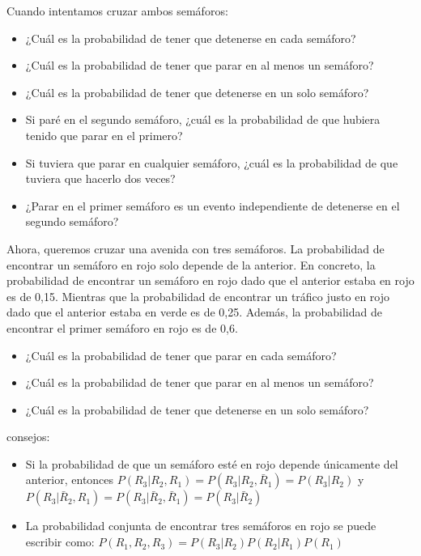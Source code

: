 \documentclass[
]{book}
\providecommand{\tightlist}{%
  \setlength{\itemsep}{0pt}\setlength{\parskip}{0pt}}
\begin{document}
Cuando intentamos cruzar ambos semáforos:

\begin{itemize}
\tightlist
\item
  ¿Cuál es la probabilidad de tener que detenerse en cada semáforo?
\item
  ¿Cuál es la probabilidad de tener que parar en al menos un semáforo?
\item
  ¿Cuál es la probabilidad de tener que detenerse en un solo semáforo?
\item
  Si paré en el segundo semáforo, ¿cuál es la probabilidad de que hubiera tenido que parar en el primero?
\item
  Si tuviera que parar en cualquier semáforo, ¿cuál es la probabilidad de que tuviera que hacerlo dos veces?
\item
  ¿Parar en el primer semáforo es un evento independiente de detenerse en el segundo semáforo?
\end{itemize}

Ahora, queremos cruzar una avenida con tres semáforos. La probabilidad de encontrar un semáforo en rojo solo depende de la anterior. En concreto, la probabilidad de encontrar un semáforo en rojo dado que el anterior estaba en rojo es de 0,15. Mientras que la probabilidad de encontrar un tráfico justo en rojo dado que el anterior estaba en verde es de 0,25. Además, la probabilidad de encontrar el primer semáforo en rojo es de 0,6.

\begin{itemize}
\tightlist
\item
  ¿Cuál es la probabilidad de tener que parar en cada semáforo?
\item
  ¿Cuál es la probabilidad de tener que parar en al menos un semáforo?
\item
  ¿Cuál es la probabilidad de tener que detenerse en un solo semáforo?
\end{itemize}

consejos:

\begin{itemize}
\item
  Si la probabilidad de que un semáforo esté en rojo depende únicamente del anterior, entonces
  \(P(R_3|R_2,R_1)=P(R_3|R_2,\bar{R}_1)=P(R_3|R_2)\) y \(P(R_3|\bar{R}_2,R_1)=P(R_3 |\bar{R}_2,\bar{R}_1)=P(R_3|\bar{R}_2)\)
\item
  La probabilidad conjunta de encontrar tres semáforos en rojo se puede escribir como:
  \(P(R_1,R_2,R_3)=P(R_3|R_2)P(R_2|R_1)P(R_1)\)
\end{itemize}
\end{document}
